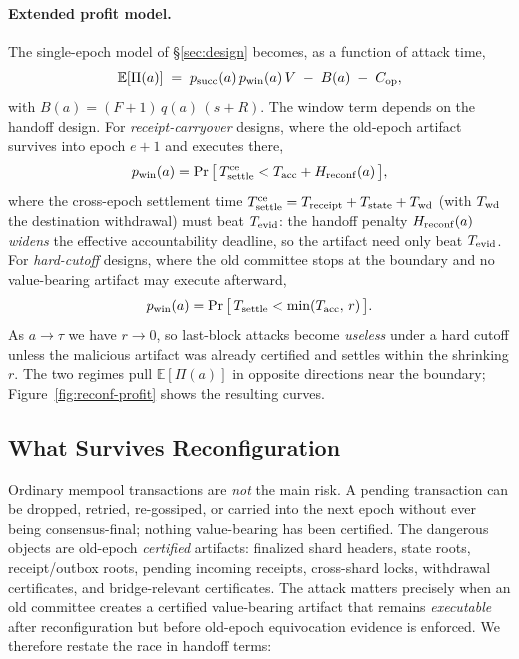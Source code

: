 \paragraph{Extended profit model.}
The single-epoch model of \S\ref{sec:design} becomes, as a function of attack time,
\begin{equation}
\mathbb{E}[\Pi(a)] \;=\; p_{\mathrm{succ}}(a)\,p_{\mathrm{win}}(a)\,V \;-\; B(a) \;-\; C_{\mathrm{op}},
\label{eq:profit-a}
\end{equation}
with $B(a)=(F{+}1)\,q(a)\,(s{+}R)$. The window term depends on the handoff design. For
\emph{receipt-carryover} designs, where the old-epoch artifact survives into epoch $e{+}1$ and
executes there,
\begin{equation}
p_{\mathrm{win}}(a)=\Pr\big[\,T_{\mathrm{settle}}^{\mathrm{ce}} < T_{\mathrm{acc}} + H_{\mathrm{reconf}}(a)\,\big],
\label{eq:pwin-carry}
\end{equation}
where the cross-epoch settlement time $T_{\mathrm{settle}}^{\mathrm{ce}}=T_{\mathrm{receipt}}+T_{\mathrm{state}}+T_{\mathrm{wd}}$ (with $T_{\mathrm{wd}}$
the destination withdrawal) must beat $T_{\mathrm{evid}}$: the handoff penalty $H_{\mathrm{reconf}}(a)$ \emph{widens} the
effective accountability deadline, so the artifact need only beat $T_{\mathrm{evid}}$. For
\emph{hard-cutoff} designs, where the old committee stops at the boundary and no value-bearing
artifact may execute afterward,
\begin{equation}
p_{\mathrm{win}}(a)=\Pr\big[\,T_{\mathrm{settle}} < \min(T_{\mathrm{acc}},\,r)\,\big].
\label{eq:pwin-cut}
\end{equation}
As $a\to\tau$ we have $r\to0$, so last-block attacks become \emph{useless} under a hard cutoff unless
the malicious artifact was already certified and settles within the shrinking $r$. The two regimes
pull $\mathbb{E}[\Pi(a)]$ in opposite directions near the boundary; Figure~\ref{fig:reconf-profit}
shows the resulting curves.

\subsection{What Survives Reconfiguration}
\label{sec:survives}

Ordinary mempool transactions are \emph{not} the main risk. A pending transaction can be dropped,
retried, re-gossiped, or carried into the next epoch without ever being consensus-final; nothing
value-bearing has been certified. The dangerous objects are old-epoch \emph{certified} artifacts:
finalized shard headers, state roots, receipt/outbox roots, pending incoming receipts, cross-shard
locks, withdrawal certificates, and bridge-relevant certificates. The attack matters precisely when
an old committee creates a certified value-bearing artifact that remains \emph{executable} after
reconfiguration but before old-epoch equivocation evidence is enforced. We therefore restate the
race in handoff terms:

